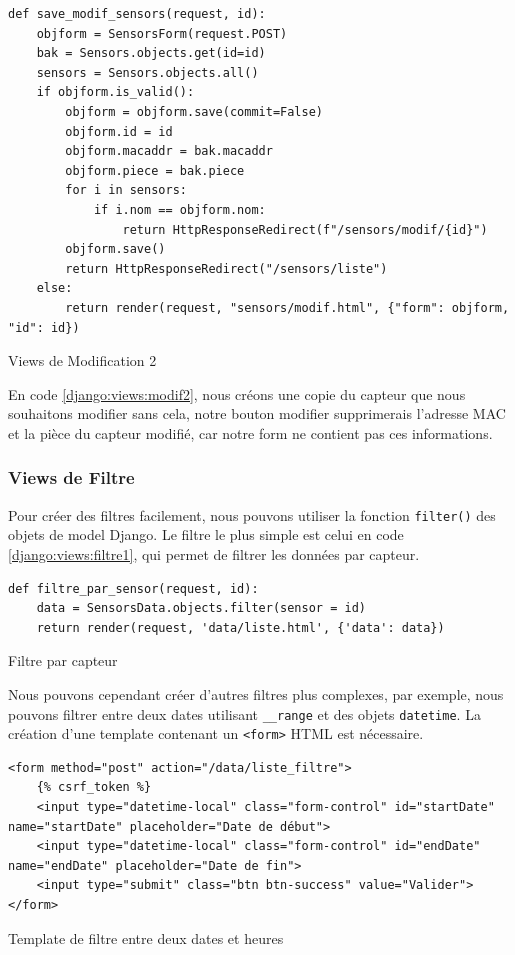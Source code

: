 \documentclass{article}
\begin{document}
\begin{listing}[H]
    \begin{verbatim}
def save_modif_sensors(request, id):
    objform = SensorsForm(request.POST)
    bak = Sensors.objects.get(id=id)
    sensors = Sensors.objects.all()
    if objform.is_valid():
        objform = objform.save(commit=False)
        objform.id = id
        objform.macaddr = bak.macaddr
        objform.piece = bak.piece
        for i in sensors:
            if i.nom == objform.nom:
                return HttpResponseRedirect(f"/sensors/modif/{id}")
        objform.save()
        return HttpResponseRedirect("/sensors/liste")
    else:
        return render(request, "sensors/modif.html", {"form": objform, "id": id})
    \end{verbatim}
    \caption{Views de Modification 2}
    \label{django:views:modif2}
\end{listing}
En code \ref{django:views:modif2}, nous créons une copie du capteur que nous souhaitons modifier sans cela, notre bouton modifier supprimerais l'adresse MAC et la pièce du capteur modifié, car notre form ne contient pas ces informations.

\subsubsection{Views de Filtre}
Pour créer des filtres facilement, nous pouvons utiliser la fonction \verb|filter()| des objets de model Django. Le filtre le plus simple est celui en code \ref{django:views:filtre1}, qui permet de filtrer les données par capteur.
\begin{listing}[H]
    \begin{verbatim}
def filtre_par_sensor(request, id):
    data = SensorsData.objects.filter(sensor = id)
    return render(request, 'data/liste.html', {'data': data})
    \end{verbatim}
    \caption{Filtre par capteur}
    \label{django:views:filtre1}
\end{listing}

Nous pouvons cependant créer d'autres filtres plus complexes, par exemple, nous pouvons filtrer entre deux dates utilisant \verb|__range| et des objets \verb|datetime|. La création d'une template contenant un \verb|<form>| HTML est nécessaire.
\begin{listing}[H]
    \begin{verbatim}
<form method="post" action="/data/liste_filtre">
    {% csrf_token %}
    <input type="datetime-local" class="form-control" id="startDate" name="startDate" placeholder="Date de début">
    <input type="datetime-local" class="form-control" id="endDate" name="endDate" placeholder="Date de fin">
    <input type="submit" class="btn btn-success" value="Valider">
</form>
    \end{verbatim}
    \caption{Template de filtre entre deux dates et heures}
    \label{template:filtre}
\end{listing}
\end{document}
